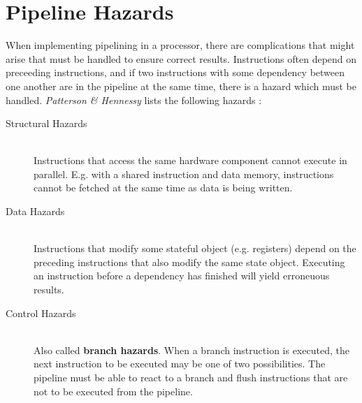 \section{Pipeline Hazards}
When implementing pipelining in a processor,
there are complications that might arise that must be handled to ensure correct results.
Instructions often depend on preceeding instructions,
and if two instructions with some dependency between one another are in the pipeline at the same time, there is a hazard which must be handled.
\textit{Patterson \& Hennessy} lists the following hazards
\cite[Chapter 4.5]{bib:patt-henn}:

\begin{description}
\item[Structural Hazards] \hfill \\
    Instructions that access the same hardware component cannot execute in parallel.
    E.g. with a shared instruction and data memory,
    instructions cannot be fetched at the same time as data is being written.
\item[Data Hazards] \hfill \\
    Instructions that modify some stateful object (e.g. registers) depend on the preceding instructions that also modify the same state object.
    Executing an instruction before a dependency has finished will yield erroneuous results.
\item[Control Hazards] \hfill \\
    Also called \textbf{branch hazards}.
    When a branch instruction is executed,
    the next instruction to be executed may be one of two possibilities.
    The pipeline must be able to react to a branch and flush instructions that are not to be executed from the pipeline.
\end{description}

